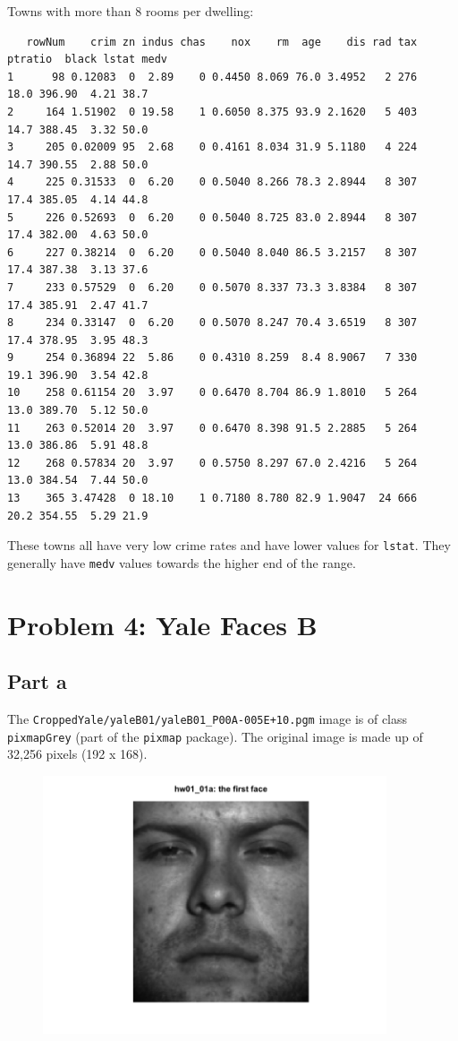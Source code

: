 \documentclass[11pt]{article}
\begin{document}
Towns with more than 8 rooms per dwelling:
\begin{verbatim}
   rowNum    crim zn indus chas    nox    rm  age    dis rad tax ptratio  black lstat medv
1      98 0.12083  0  2.89    0 0.4450 8.069 76.0 3.4952   2 276    18.0 396.90  4.21 38.7
2     164 1.51902  0 19.58    1 0.6050 8.375 93.9 2.1620   5 403    14.7 388.45  3.32 50.0
3     205 0.02009 95  2.68    0 0.4161 8.034 31.9 5.1180   4 224    14.7 390.55  2.88 50.0
4     225 0.31533  0  6.20    0 0.5040 8.266 78.3 2.8944   8 307    17.4 385.05  4.14 44.8
5     226 0.52693  0  6.20    0 0.5040 8.725 83.0 2.8944   8 307    17.4 382.00  4.63 50.0
6     227 0.38214  0  6.20    0 0.5040 8.040 86.5 3.2157   8 307    17.4 387.38  3.13 37.6
7     233 0.57529  0  6.20    0 0.5070 8.337 73.3 3.8384   8 307    17.4 385.91  2.47 41.7
8     234 0.33147  0  6.20    0 0.5070 8.247 70.4 3.6519   8 307    17.4 378.95  3.95 48.3
9     254 0.36894 22  5.86    0 0.4310 8.259  8.4 8.9067   7 330    19.1 396.90  3.54 42.8
10    258 0.61154 20  3.97    0 0.6470 8.704 86.9 1.8010   5 264    13.0 389.70  5.12 50.0
11    263 0.52014 20  3.97    0 0.6470 8.398 91.5 2.2885   5 264    13.0 386.86  5.91 48.8
12    268 0.57834 20  3.97    0 0.5750 8.297 67.0 2.4216   5 264    13.0 384.54  7.44 50.0
13    365 3.47428  0 18.10    1 0.7180 8.780 82.9 1.9047  24 666    20.2 354.55  5.29 21.9
\end{verbatim}

These towns all have very low crime rates and have lower values for \texttt{lstat}. They generally have \texttt{medv} values towards the higher end of the range.


\section*{Problem 4: Yale Faces B}

\subsection*{Part a}

The \texttt{CroppedYale/yaleB01/yaleB01\_P00A-005E+10.pgm} image is of class \texttt{pixmapGrey} (part of the \texttt{pixmap} package). The original image is made up of 32,256 pixels (192 x 168).

\begin{figure}[H]
	\centering
	\includegraphics[width=4in]{4_01a.png}
\end{figure}
\end{document}
